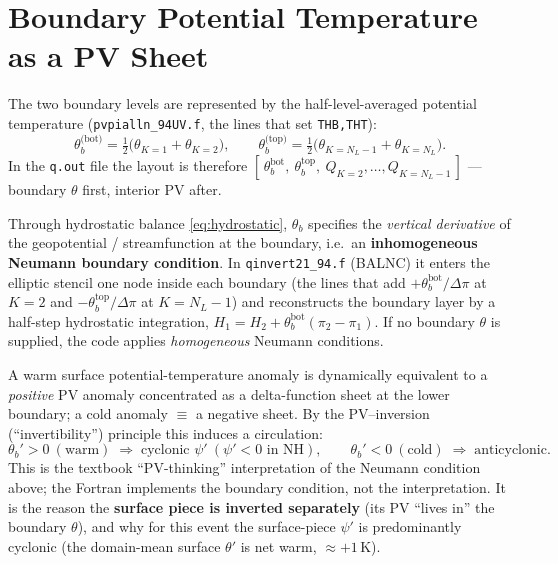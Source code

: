 \section{Boundary Potential Temperature as a PV Sheet}
\label{sec:boundary_theta}

The two boundary levels are represented by the half-level-averaged
potential temperature (\texttt{pvpialln\_94UV.f}, the lines that set
\texttt{THB,THT}):
\begin{equation}
\theta_b^{\text{(bot)}} = \tfrac12\bigl(\theta_{K=1}+\theta_{K=2}\bigr),\qquad
\theta_b^{\text{(top)}} = \tfrac12\bigl(\theta_{K=N_L-1}+\theta_{K=N_L}\bigr).
\end{equation}
In the \texttt{q.out} file the layout is therefore
$[\,\theta_b^{\text{bot}},\ \theta_b^{\text{top}},\ Q_{K=2},\ldots,Q_{K=N_L-1}\,]$
--- boundary $\theta$ first, interior PV after.

Through hydrostatic balance \cref{eq:hydrostatic}, $\theta_b$ specifies
the \emph{vertical derivative} of the geopotential / streamfunction at
the boundary, i.e.\ an \textbf{inhomogeneous Neumann boundary
condition}.  In \texttt{qinvert21\_94.f} (BALNC) it enters the elliptic
stencil one node inside each boundary (the lines that add
$+\theta_b^{\text{bot}}/\Delta\pi$ at $K{=}2$ and
$-\theta_b^{\text{top}}/\Delta\pi$ at $K{=}N_L-1$) and reconstructs the
boundary layer by a half-step hydrostatic integration,
$H_{1}=H_{2}+\theta_b^{\text{bot}}(\pi_2-\pi_1)$.  If no boundary
$\theta$ is supplied, the code applies \emph{homogeneous} Neumann
conditions.

\begin{keybox}
A warm surface potential-temperature anomaly is dynamically equivalent
to a \emph{positive} PV anomaly concentrated as a delta-function sheet
at the lower boundary; a cold anomaly $\equiv$ a negative sheet.  By the
PV--inversion (``invertibility'') principle this induces a circulation:
\[
\theta_b'>0\ (\text{warm}) \;\Rightarrow\; \text{cyclonic } \psi'\ (\psi'<0 \text{ in NH}),
\qquad
\theta_b'<0\ (\text{cold}) \;\Rightarrow\; \text{anticyclonic}.
\]
This is the textbook ``PV-thinking'' interpretation
\cite{HoskinsMcIntyreRobertson1985} of the Neumann condition above; the
Fortran implements the boundary condition, not the interpretation.  It
is the reason the \textbf{surface piece is inverted separately}
(its PV ``lives in'' the boundary $\theta$), and why for this event the
surface-piece $\psi'$ is predominantly cyclonic (the domain-mean surface
$\theta'$ is net warm, $\approx +1$\,K).
\end{keybox}

